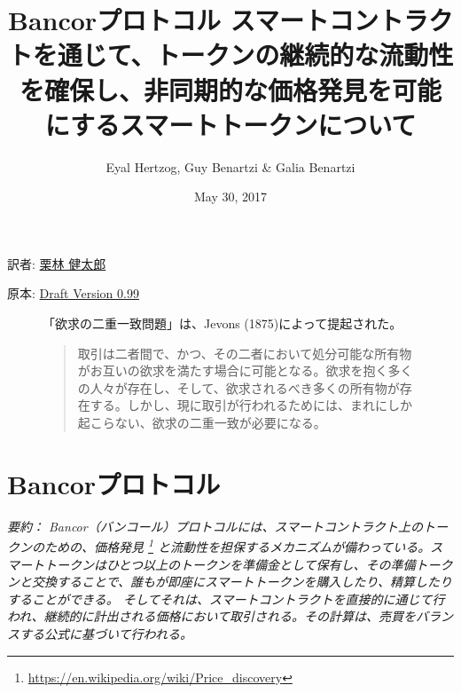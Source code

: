 \documentclass{jsarticle}
\begin{document}
\title{
  \textbf{Bancorプロトコル}
  \protect\linebreak
  \protect\linebreak
  \large
  スマートコントラクトを通じて、トークンの継続的な流動性を確保し、非同期的な価格発見を可能にするスマートトークンについて
}

\author{Eyal Hertzog, Guy Benartzi \& Galia Benartzi}
\date{May 30, 2017}

\maketitle

\begin{center}
  \item[訳者:] \href{https://kentarok.org}{栗林 健太郎}
  \item[原本:] \href{http://www.hyuki.com/girl/}{Draft Version 0.99}
\end{center}

\begin{figure}[b]
  「欲求の二重一致問題」は、Jevons (1875)によって提起された。

  \begin{quotation}  
    取引は二者間で、かつ、その二者において処分可能な所有物がお互いの欲求を満たす場合に可能となる。欲求を抱く多くの人々が存在し、そして、欲求されるべき多くの所有物が存在する。しかし、現に取引が行われるためには、まれにしか起こらない、欲求の二重一致が必要になる。
  \end{quotation}
\end{figure}

\newpage
\setcounter{tocdepth}{3}
\tableofcontents
\newpage

\section{Bancorプロトコル}

\emph{
  要約： Bancor（バンコール）プロトコルには、スマートコントラクト上のトークンのための、価格発見
  \footnote{\url{https://en.wikipedia.org/wiki/Price_discovery}}
  と流動性を担保するメカニズムが備わっている。スマートトークンはひとつ以上のトークンを準備金として保有し、その準備トークンと交換することで、誰もが即座にスマートトークンを購入したり、精算したりすることができる。 そしてそれは、スマートコントラクトを直接的に通じて行われ、継続的に計出される価格において取引される。その計算は、売買をバランスする公式に基づいて行われる。
} \\
\end{document}
